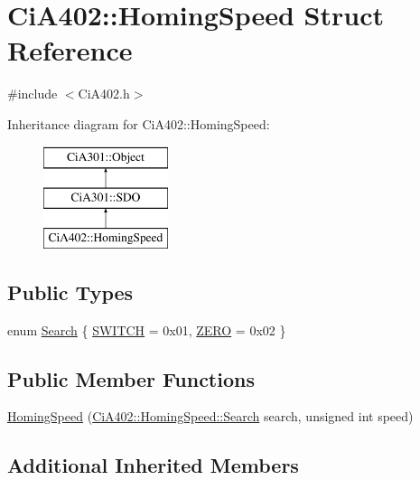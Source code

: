 \hypertarget{struct_ci_a402_1_1_homing_speed}{}\section{Ci\+A402\+:\+:Homing\+Speed Struct Reference}
\label{struct_ci_a402_1_1_homing_speed}


{\ttfamily \#include $<$Ci\+A402.\+h$>$}

Inheritance diagram for Ci\+A402\+:\+:Homing\+Speed\+:\begin{figure}[H]
\begin{center}
\leavevmode
\includegraphics[height=3.000000cm]{d4/d73/struct_ci_a402_1_1_homing_speed}
\end{center}
\end{figure}
\subsection*{Public Types}
\begin{DoxyCompactItemize}
\item 
enum \hyperlink{struct_ci_a402_1_1_homing_speed_a9a10a4d933dcebe91898b7840fac5b94}{Search} \{ \hyperlink{struct_ci_a402_1_1_homing_speed_a9a10a4d933dcebe91898b7840fac5b94a8bda3bac6a07ac2db79c15063670d441}{S\+W\+I\+T\+C\+H} = 0x01, 
\hyperlink{struct_ci_a402_1_1_homing_speed_a9a10a4d933dcebe91898b7840fac5b94a153cc39539c9eec84b0b7fc0304fc507}{Z\+E\+R\+O} = 0x02
 \}
\end{DoxyCompactItemize}
\subsection*{Public Member Functions}
\begin{DoxyCompactItemize}
\item 
\hyperlink{struct_ci_a402_1_1_homing_speed_a26270cd5c1b87a013b247efd29458160}{Homing\+Speed} (\hyperlink{struct_ci_a402_1_1_homing_speed_a9a10a4d933dcebe91898b7840fac5b94}{Ci\+A402\+::\+Homing\+Speed\+::\+Search} search, unsigned int speed)
\end{DoxyCompactItemize}
\subsection*{Additional Inherited Members}


